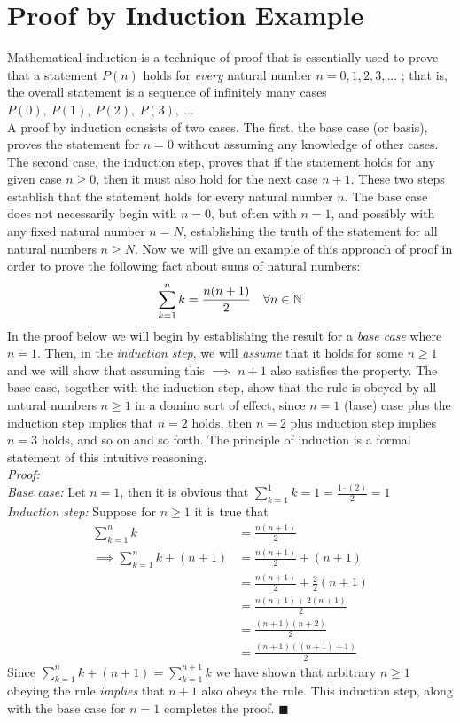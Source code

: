 \section{Proof by Induction Example} Mathematical induction is a technique of proof that is essentially used to prove that a statement $P(n)$ holds for \textit{every} natural number $n = 0, 1, 2, 3, ...$ ; that is, the overall statement is a sequence of infinitely many cases $P(0), \ P(1), \ P(2), \ P(3), \ ...$ \\
\noindent A proof by induction consists of two cases. The first, the base case (or basis), proves the statement for $n = 0$ without assuming any knowledge of other cases. The second case, the induction step, proves that if the statement holds for any given case $n\geq 0$, then it must also hold for the next case $n + 1$. These two steps establish that the statement holds for every natural number $n$. The base case does not necessarily begin with $n = 0$, but often with $n = 1$, and possibly with any fixed natural number $n = N$, establishing the truth of the statement for all natural numbers $n \geq N$. Now we will give an example of this approach of proof in order to prove the following fact about sums of natural numbers:
\begin{align}
    \sum_{k=1}^{n} k = \frac{n(n+1)}{2} \ \ \ \forall n \in {\mathbb{ N}} \nonumber
\end{align}
In the proof below we will begin by establishing the result for a \textit{base case} where $n=1$. Then, in the \textit{induction step}, we will \textit{assume} that it holds for some $n\geq 1$ and we will show that assuming this $\implies$ $n+1$ also satisfies the property. The base case, together with the induction step, show that the rule is obeyed by all natural numbers $n\geq 1$ in a domino sort of effect, since $n=1$ (base) case plus the induction step implies that $n=2$ holds, then $n=2$ plus induction step implies $n=3$ holds, and so on and so forth. The principle of induction is a formal statement of this intuitive reasoning.\\
\textit{Proof:}\\
\noindent\textit{Base case:} Let $n=1$, then it is obvious that $\sum_{k=1}^1 k = 1 = \frac{1\cdot(2)}{2}=1$\\
\textit{Induction step:} Suppose for $n\geq 1$ it is true that 
\begin{align}
    \sum_{k=1}^n k&=\frac{n(n+1)}{2}\nonumber\\ 
    \implies \sum_{k=1}^{n} k + (n+1)&=\frac{n(n+1)}{2} +(n+1)\nonumber\\ 
    &=\frac{n(n+1)}{2} +\frac{2}{2}(n+1)\nonumber\\
    &=\frac{n(n+1)+2(n+1)}{2} \nonumber \\
    &=\frac{(n+1)(n+2)}{2} \nonumber \\
    &=\frac{(n+1)((n+1)+1)}{2} \nonumber
\end{align}
Since $\sum_{k=1}^{n} k + (n+1)=\sum_{k=1}^{n+1} k$ we have shown that arbitrary $n\geq 1$ obeying the rule \textit{implies} that $n+1$ also obeys the rule. This induction step, along with the base case for $n=1$ completes the proof. $\blacksquare$
\smallbreak

